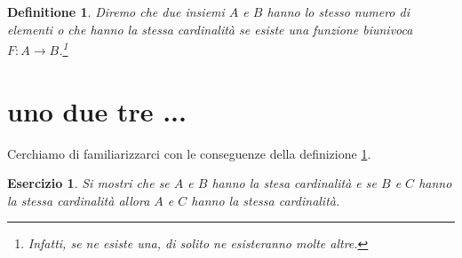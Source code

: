 \documentclass{amsart}
\newtheorem{defin}[thm]{Definitione}
\newtheorem{es}[thm]{Esercizio}
\begin{document}
\begin{defin}\label{def:cont}
Diremo che due insiemi $A$ e $B$ hanno lo stesso numero di elementi o
che hanno \emph{la stessa cardinalit\`a} se esiste una funzione biunivoca
$F:A\to B$.\footnote{Infatti, se ne esiste una, di solito ne esisteranno
molte altre.}
\end{defin}

\section{uno due tre ...}\label{sec:uno}
Cerchiamo di familiarizzarci con le conseguenze della definizione
\ref{def:cont}.

\begin{es}\label{es:uno}
Si mostri che se $A$ e $B$ hanno la stesa cardinalit\`a e se $B$ e $C$
hanno la stessa cardinalit\`a allora $A$ e $C$ hanno la stessa cardinalit\`a.
\end{es}
\end{document}
